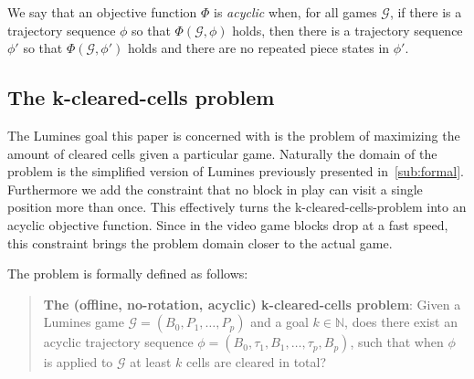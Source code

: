 \bigbreak

\begin{defn}
    We say that an objective function $\Phi$ is \textit{acyclic} when, for all games $\mathcal{G}$, if there is a trajectory sequence $\phi$ so that $\Phi(\mathcal{G}, \phi)$ holds, then there is a trajectory sequence $\phi'$ so that $\Phi(\mathcal{G}, \phi')$ holds and there are no repeated piece states in $\phi'$.
\end{defn}

\subsection{The k-cleared-cells problem}
The Lumines goal this paper is concerned with is the problem of maximizing the amount of cleared cells given a particular game. Naturally the domain of the problem is the simplified version of Lumines previously presented in~\ref{sub:formal}. Furthermore we add the constraint that no block in play can visit a single position more than once. This effectively turns the k-cleared-cells-problem into an acyclic objective function. Since in the video game blocks drop at a fast speed, this constraint brings the problem domain closer to the actual game.

The problem is formally defined as follows:

\begin{quote}
    \textbf{The (offline, no-rotation, acyclic) k-cleared-cells problem}: Given a Lumines game $\mathcal{G} = (B_0, P_1, \ldots, P_p)$ and a goal $k \in \mathbb{N}$, does there exist an acyclic trajectory sequence $\phi=(B_0, \tau_1, B_1, \ldots ,\tau_p, B_p)$, such that when $\phi$ is applied to $\mathcal{G}$ at least $k$ cells are cleared in total?
\end{quote}
